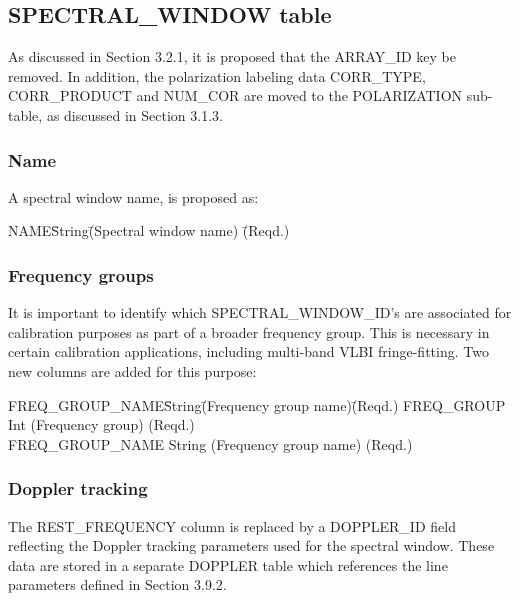 \documentclass{article}
\begin{document}
\subsection{SPECTRAL\_WINDOW table}

As discussed in Section 3.2.1, it is proposed that the ARRAY\_ID key be
removed.  In addition, the polarization labeling data CORR\_TYPE,
CORR\_PRODUCT and NUM\_COR are moved to the POLARIZATION sub-table, as
discussed in Section 3.1.3.

\subsubsection{Name}

A spectral window name, is proposed as:

\begin{tabbing}
NAME\quad\quad \= String\quad\quad \= 
(Spectral window name) \quad\quad\quad \= (Reqd.) \\
\end{tabbing}


\subsubsection{Frequency groups}

It is important to identify which SPECTRAL\_WINDOW\_ID's are
associated for calibration purposes as part of a broader frequency
group.  This is necessary in certain calibration applications,
including multi-band VLBI fringe-fitting. Two new columns are
added for this purpose:

\begin{tabbing}
FREQ\_GROUP\_NAME\quad\quad \= String\quad\quad \=
(Frequency group name)\quad\quad \= (Reqd.) \kill
FREQ\_GROUP \> Int \> (Frequency group) \> (Reqd.) \\
FREQ\_GROUP\_NAME \> String \> (Frequency group name) \> (Reqd.) \\
\end{tabbing}

\subsubsection{Doppler tracking}

The REST\_FREQUENCY column is replaced by a DOPPLER\_ID field
reflecting the Doppler tracking parameters used for the spectral
window. These data are stored in a separate DOPPLER table which
references the line parameters defined in Section 3.9.2.
\end{document}
